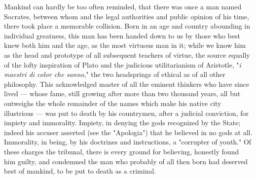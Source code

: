 \documentclass[12pt]{report}
\begin{document}
Mankind can hardly be too often reminded, that there was once a man named Socrates, between whom and the legal authorities and public opinion of his time, there took place a memorable collision. Born in an age and country abounding in individual greatness, this man has been handed down to us by those who best knew both him and the age, as the most virtuous man in it; while we know him as the head and prototype of all subsequent teachers of virtue, the source equally of the lofty inspiration of Plato and the judicious utilitarianism of Aristotle, "\emph{i maestri di color che sanno}," the two headsprings of ethical as of all other philosophy. This acknowledged master of all the eminent thinkers who have since lived — whose fame, still growing after more than two thousand years, all but outweighs the whole remainder of the names which make his native city illustrious — was put to death by his countrymen, after a judicial conviction, for impiety and immorality. Impiety, in denying the gods recognized by the State; indeed his accuser asserted (see the "Apologia") that he believed in no gods at all. Immorality, in being, by his doctrines and instructions, a "corrupter of youth." Of these charges the tribunal, there is every ground for believing, honestly found him guilty, and condemned the man who probably of all then born had deserved best of mankind, to be put to death as a criminal.
\end{document}
